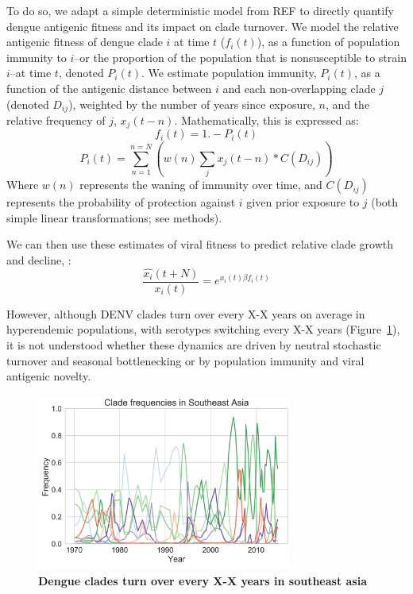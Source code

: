 \documentclass[11pt,oneside,letterpaper]{article}
\begin{document}
To do so, we adapt a simple deterministic model from REF to directly quantify dengue antigenic fitness and its impact on clade turnover.
We model the relative antigenic fitness of dengue clade $i$ at time $t$ ($f_i(t)$), as a function of population immunity to $i$--or the proportion of the population that is nonsusceptible to strain $i$--at time $t$, denoted $P_i(t)$.
We estimate population immunity, $P_i(t)$, as a function of the antigenic distance between $i$ and each non-overlapping clade $j$ (denoted $D_{ij}$), weighted by the number of years since exposure, $n$, and the relative frequency of $j$, $x_j(t-n)$.
Mathematically, this is expressed as: $$ f_i(t) = 1. - P_i(t)$$
$$P_i(t) = \sum_{n=1}^{n=N} (w(n)  \sum_{j} x_j(t-n) * C( D_{ij})) $$
Where $w(n)$ represents the waning of immunity over time, and $C(D_{ij})$ represents the probability of protection against $i$ given prior exposure to $j$ (both simple linear transformations; see methods).

We can then use these estimates of viral fitness to predict relative clade growth and decline, :
$$\frac{\hat{x_i}(t+N)}{x_i(t)} = e^{x_i(t) \beta f_i(t)}$$



However, although DENV clades turn over every X-X years on average in hyperendemic populations, with serotypes switching every X-X years (Figure~\ref{frequencies_time}), it is not understood whether these dynamics are driven by neutral stochastic turnover and seasonal bottlenecking or by population immunity and viral antigenic novelty.

\begin{figure}[h]
 \centering
	\includegraphics[width=0.75\textwidth]{figs/frequencies_time.png}
	\caption{\textbf{
Dengue clades turn over every X-X years in southeast asia
}}
	\label{frequencies_time}
\end{figure}
\end{document}
